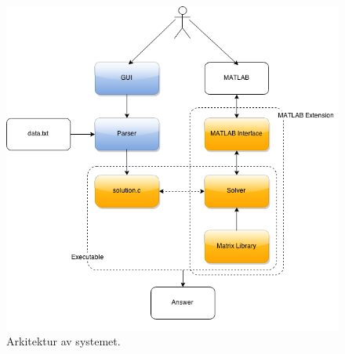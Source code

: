 \begin{figure}[h]
	\begin{center}
		\includegraphics[scale=0.5]{bilder/arkitektur.png}
	\end{center}
	\caption{Arkitektur av systemet.}
\end{figure}

